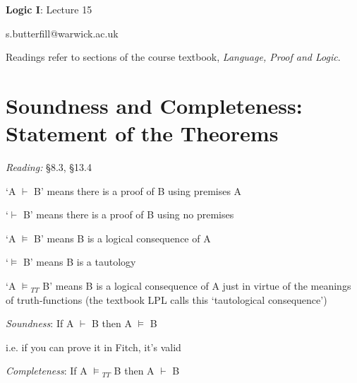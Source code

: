 \documentclass[12pt]{extarticle}
\date{}
\makeatletter
\def \ititle {Origins of Mind}
\def \isubtitle {Lecture 08}
\def \iemail{s.butterfill@warwick.ac.uk}
\makeatother
\begin{document}

\begin{multicols*}{3}

\setlength\footnotesep{1em}









\def \ititle {Logic I}
 
\def \isubtitle {Lecture 15}
 
\begin{center}
 
{\Large
 
\textbf{\ititle}: \isubtitle
 
}
 
 
 
\iemail %
 
\end{center}
 
Readings refer to sections of the course textbook, \emph{Language, Proof and Logic}.
 
 
 
\section{Soundness and Completeness: Statement of the Theorems}
 
\emph{Reading:} §8.3, §13.4
 
‘A $\vdash$ B’ means there is a proof of B using premises A
 
‘$\vdash$ B’ means there is a proof of B using no premises
 
‘A $\models$ B’ means B is a logical consequence of A
 
‘$\models$ B’ means B is a tautology
 
‘A $\models$$_{TT}$ B’ means B is a logical consequence of A just in virtue of the meanings of truth-functions (the textbook LPL calls this ‘tautological consequence’)
 
\emph{Soundness}: If A $\vdash$ B then A $\models$ B
 
\hspace{3mm} i.e. if you can prove it in Fitch, it’s valid
 
\emph{Completeness}: If A $\models$$_{TT}$ B then A $\vdash$ B
 

\end{multicols*}
\end{document}
